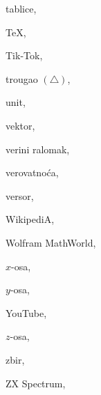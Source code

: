 \begin{theindex}
  \indexspace

  \item tablice, 
  \item \TeX, 
  \item Tik-Tok, 
  \item trougao $(\triangle )$, 

  \indexspace

  \item unit, 

  \indexspace

  \item vektor, 
  \item veri{\zv}ni ralomak, 
  \item verovatno{{\'c}}a, 
  \item versor, 

  \indexspace

  \item {\sc  WikipediA}, 
  \item Wolfram MathWorld, 

  \indexspace

  \item $x$-osa, 

  \indexspace

  \item $y$-osa, 
  \item {\sf  YouTube}, 

  \indexspace

  \item $z$-osa, 
  \item zbir, 
  \item \textsf{ZX Spectrum}, 

\end{theindex}

\endgroup
